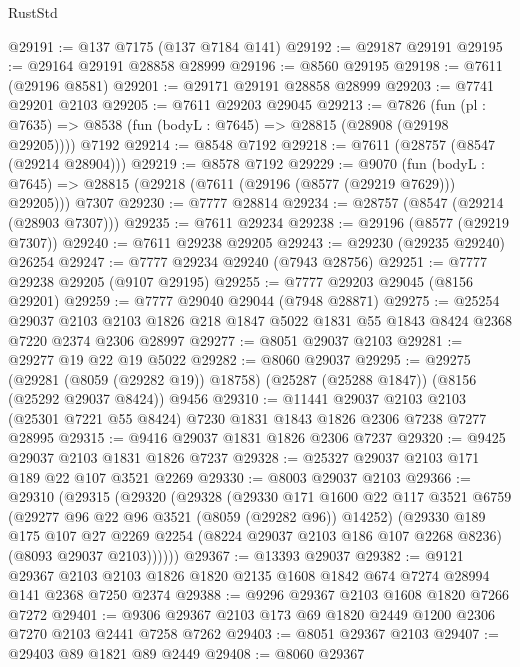 \begin{lexlean}{RustStd}
\begin{coremodule}
@29191 := @137 @7175 (@137 @7184 @141)
@29192 := @29187 @29191
@29195 := @29164 @29191 @28858 @28999
@29196 := @8560 @29195
@29198 := @7611 (@29196 @8581)
@29201 := @29171 @29191 @28858 @28999
@29203 := @7741 @29201 @2103
@29205 := @7611 @29203 @29045
@29213 := @7826
    (fun (pl : @7635) => @8538 (fun (bodyL : @7645) => @28815 (@28908 (@29198 @29205))))
    @7192
@29214 := @8548 @7192
@29218 := @7611 (@28757 (@8547 (@29214 @28904)))
@29219 := @8578 @7192
@29229 := @9070
    (fun (bodyL : @7645) => @28815 (@29218 (@7611 (@29196 (@8577 (@29219 @7629))) @29205)))
    @7307
@29230 := @7777 @28814
@29234 := @28757 (@8547 (@29214 (@28903 @7307)))
@29235 := @7611 @29234
@29238 := @29196 (@8577 (@29219 @7307))
@29240 := @7611 @29238 @29205
@29243 := @29230 (@29235 @29240) @26254
@29247 := @7777 @29234 @29240 (@7943 @28756)
@29251 := @7777 @29238 @29205 (@9107 @29195)
@29255 := @7777 @29203 @29045 (@8156 @29201)
@29259 := @7777 @29040 @29044 (@7948 @28871)
@29275 := @25254
    @29037
    @2103
    @2103
    @1826
    @218
    @1847
    @5022
    @1831
    @55
    @1843
    @8424
    @2368
    @7220
    @2374
    @2306
    @28997
@29277 := @8051 @29037 @2103
@29281 := @29277 @19 @22 @19 @5022
@29282 := @8060 @29037
@29295 := @29275
    (@29281 (@8059 (@29282 @19)) @18758)
    (@25287 (@25288 @1847))
    (@8156 (@25292 @29037 @8424))
    @9456
@29310 := @11441
    @29037
    @2103
    @2103
    (@25301 @7221 @55 @8424)
    @7230
    @1831
    @1843
    @1826
    @2306
    @7238
    @7277
    @28995
@29315 := @9416 @29037 @1831 @1826 @2306 @7237
@29320 := @9425 @29037 @2103 @1831 @1826 @7237
@29328 := @25327 @29037 @2103 @171 @189 @22 @107 @3521 @2269
@29330 := @8003 @29037 @2103
@29366 := @29310
    (@29315
      (@29320
        (@29328
          (@29330
            @171
            @1600
            @22
            @117
            @3521
            @6759
            (@29277 @96 @22 @96 @3521 (@8059 (@29282 @96)) @14252)
            (@29330
              @189
              @175
              @107
              @27
              @2269
              @2254
              (@8224 @29037 @2103 @186 @107 @2268 @8236)
              (@8093 @29037 @2103))))))
@29367 := @13393 @29037
@29382 := @9121
    @29367
    @2103
    @2103
    @1826
    @1820
    @2135
    @1608
    @1842
    @674
    @7274
    @28994
    @141
    @2368
    @7250
    @2374
@29388 := @9296 @29367 @2103 @1608 @1820 @7266 @7272
@29401 := @9306 @29367 @2103 @173 @69 @1820 @2449 @1200 @2306 @7270 @2103 @2441 @7258 @7262
@29403 := @8051 @29367 @2103
@29407 := @29403 @89 @1821 @89 @2449
@29408 := @8060 @29367

\end{coremodule}
\end{lexlean}
